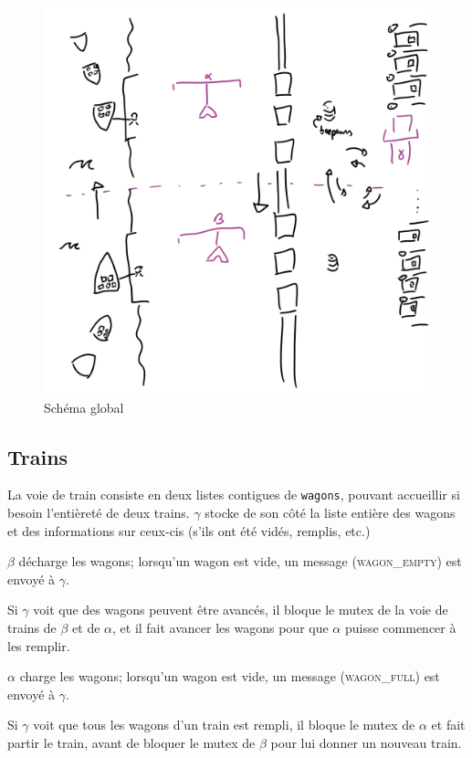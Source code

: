 \documentclass[12pt]{article}
\begin{document}
\begin{figure}[H]
    \includegraphics[width=0.95\columnwidth]{schema.png}
    \caption{Schéma global\label{fig:schema}}
\end{figure}

\subsection{Trains}

La voie de train consiste en deux listes contigues de \texttt{wagons}, pouvant accueillir si besoin l'entièreté de deux trains.
$\gamma$ stocke de son côté la liste entière des wagons et des informations sur ceux-cis (s'ils ont été vidés, remplis, etc.)

$\beta$ décharge les wagons; lorsqu'un wagon est vide, un message (\textsc{wagon\_empty}) est envoyé à $\gamma$.

Si $\gamma$ voit que des wagons peuvent être avancés, il bloque le mutex de la voie de trains de $\beta$ et de $\alpha$, et il fait avancer les wagons pour que $\alpha$ puisse commencer à les remplir.

$\alpha$ charge les wagons; lorsqu'un wagon est vide, un message (\textsc{wagon\_full}) est envoyé à $\gamma$.

Si $\gamma$ voit que tous les wagons d'un train est rempli, il bloque le mutex de $\alpha$ et fait partir le train, avant de bloquer le mutex de $\beta$ pour lui donner un nouveau train.
\end{document}
